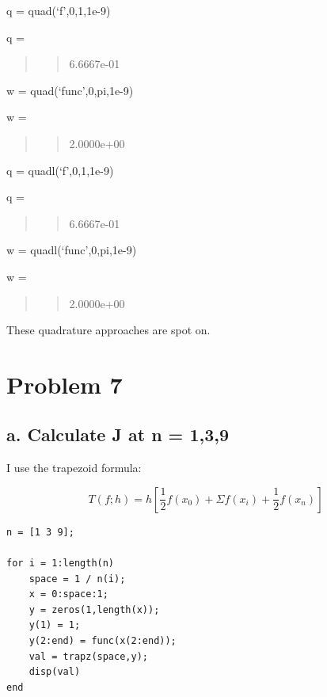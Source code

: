 \documentclass[]{article}
\begin{document}
q = quad(`f',0,1,1e-9)

q =

\begin{quote}
\begin{quote}
6.6667e-01
\end{quote}
\end{quote}

w = quad(`func',0,pi,1e-9)

w =

\begin{quote}
\begin{quote}
2.0000e+00
\end{quote}
\end{quote}

q = quadl(`f',0,1,1e-9)

q =

\begin{quote}
\begin{quote}
6.6667e-01
\end{quote}
\end{quote}

w = quadl(`func',0,pi,1e-9)

w =

\begin{quote}
\begin{quote}
2.0000e+00
\end{quote}
\end{quote}

These quadrature approaches are spot on.

\section{Problem 7}\label{problem-7}

\subsection{a. Calculate J at n = 1,3,9}\label{a.-calculate-j-at-n-139}

I use the trapezoid formula:

\[T(f;h) = h[\frac12f(x_0) + \Sigma f(x_i) + \frac12 f(x_n)]\]

\begin{verbatim}
n = [1 3 9];

for i = 1:length(n)
    space = 1 / n(i);
    x = 0:space:1;
    y = zeros(1,length(x));
    y(1) = 1;
    y(2:end) = func(x(2:end));
    val = trapz(space,y);
    disp(val)
end
\end{verbatim}
\end{document}

